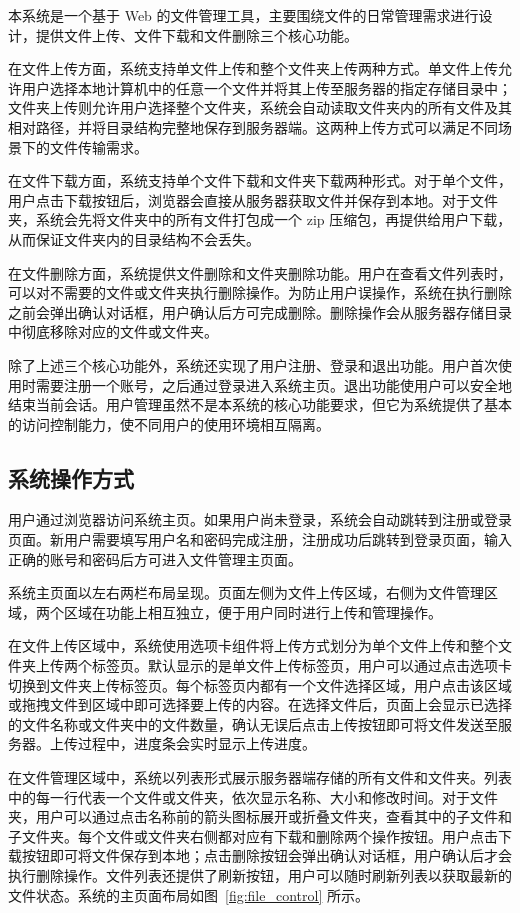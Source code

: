 \documentclass[UTF8,zihao=-4]{ctexrep}
\begin{document}
本系统是一个基于 Web 的文件管理工具，主要围绕文件的日常管理需求进行设计，提供文件上传、文件下载和文件删除三个核心功能。

在文件上传方面，系统支持单文件上传和整个文件夹上传两种方式。单文件上传允许用户选择本地计算机中的任意一个文件并将其上传至服务器的指定存储目录中；文件夹上传则允许用户选择整个文件夹，系统会自动读取文件夹内的所有文件及其相对路径，并将目录结构完整地保存到服务器端。这两种上传方式可以满足不同场景下的文件传输需求。

在文件下载方面，系统支持单个文件下载和文件夹下载两种形式。对于单个文件，用户点击下载按钮后，浏览器会直接从服务器获取文件并保存到本地。对于文件夹，系统会先将文件夹中的所有文件打包成一个 zip 压缩包，再提供给用户下载，从而保证文件夹内的目录结构不会丢失。

在文件删除方面，系统提供文件删除和文件夹删除功能。用户在查看文件列表时，可以对不需要的文件或文件夹执行删除操作。为防止用户误操作，系统在执行删除之前会弹出确认对话框，用户确认后方可完成删除。删除操作会从服务器存储目录中彻底移除对应的文件或文件夹。

除了上述三个核心功能外，系统还实现了用户注册、登录和退出功能。用户首次使用时需要注册一个账号，之后通过登录进入系统主页。退出功能使用户可以安全地结束当前会话。用户管理虽然不是本系统的核心功能要求，但它为系统提供了基本的访问控制能力，使不同用户的使用环境相互隔离。

\subsection{系统操作方式}

用户通过浏览器访问系统主页。如果用户尚未登录，系统会自动跳转到注册或登录页面。新用户需要填写用户名和密码完成注册，注册成功后跳转到登录页面，输入正确的账号和密码后方可进入文件管理主页面。

系统主页面以左右两栏布局呈现。页面左侧为文件上传区域，右侧为文件管理区域，两个区域在功能上相互独立，便于用户同时进行上传和管理操作。

在文件上传区域中，系统使用选项卡组件将上传方式划分为单个文件上传和整个文件夹上传两个标签页。默认显示的是单文件上传标签页，用户可以通过点击选项卡切换到文件夹上传标签页。每个标签页内都有一个文件选择区域，用户点击该区域或拖拽文件到区域中即可选择要上传的内容。在选择文件后，页面上会显示已选择的文件名称或文件夹中的文件数量，确认无误后点击上传按钮即可将文件发送至服务器。上传过程中，进度条会实时显示上传进度。

在文件管理区域中，系统以列表形式展示服务器端存储的所有文件和文件夹。列表中的每一行代表一个文件或文件夹，依次显示名称、大小和修改时间。对于文件夹，用户可以通过点击名称前的箭头图标展开或折叠文件夹，查看其中的子文件和子文件夹。每个文件或文件夹右侧都对应有下载和删除两个操作按钮。用户点击下载按钮即可将文件保存到本地；点击删除按钮会弹出确认对话框，用户确认后才会执行删除操作。文件列表还提供了刷新按钮，用户可以随时刷新列表以获取最新的文件状态。系统的主页面布局如图~\ref{fig:file_control} 所示。
\end{document}
